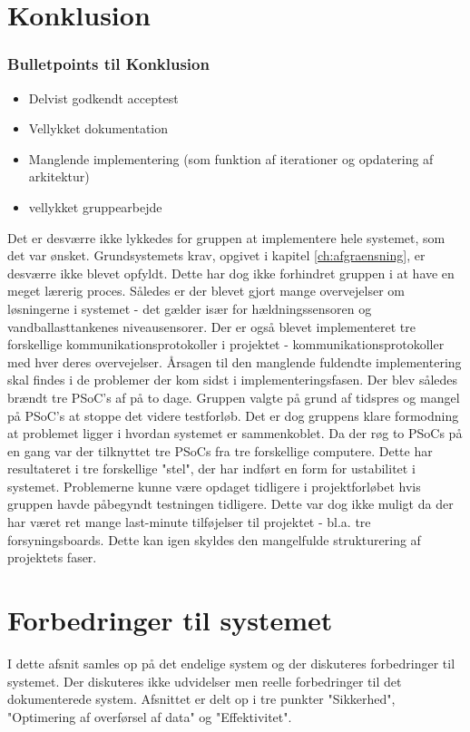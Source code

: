 \chapter{Konklusion}
\subsection{Bulletpoints til Konklusion}
\begin{itemize}
\item Delvist godkendt acceptest
\item Vellykket dokumentation
\item Manglende implementering (som funktion af iterationer og opdatering af arkitektur)
\item vellykket gruppearbejde
\end{itemize}

Det er desværre ikke lykkedes for gruppen at implementere hele systemet, som det var ønsket. Grundsystemets krav, opgivet i kapitel \ref{ch:afgraensning}, er desværre ikke blevet opfyldt. Dette har dog ikke forhindret gruppen i at have en meget lærerig proces. Således er der blevet gjort mange overvejelser om løsningerne i systemet - det gælder især for hældningssensoren og vandballasttankenes niveausensorer.
Der er også blevet implementeret tre forskellige kommunikationsprotokoller i projektet - kommunikationsprotokoller med hver deres overvejelser. Årsagen til den manglende fuldendte implementering skal findes i de problemer der kom sidst i implementeringsfasen. Der blev således brændt tre PSoC's af på to dage. Gruppen valgte på grund af tidspres og mangel på PSoC's at stoppe det videre testforløb. Det er dog gruppens klare formodning at problemet ligger i hvordan systemet er sammenkoblet. Da der røg to PSoCs på en gang var der tilknyttet tre PSoCs fra tre forskellige computere. Dette har resultateret i tre forskellige "stel", der har indført en form for ustabilitet i systemet.
Problemerne kunne være opdaget tidligere i projektforløbet hvis gruppen havde påbegyndt testningen tidligere. Dette var dog ikke muligt da der har været ret mange last-minute tilføjelser til projektet - bl.a. tre forsyningsboards. Dette kan igen skyldes den mangelfulde strukturering af projektets faser.

\chapter{Forbedringer til systemet}

I dette afsnit samles op på det endelige system og der diskuteres forbedringer til systemet. Der diskuteres ikke udvidelser men reelle forbedringer til det dokumenterede system. Afsnittet er delt op i tre punkter "Sikkerhed", "Optimering af overførsel af data" og "Effektivitet". 

